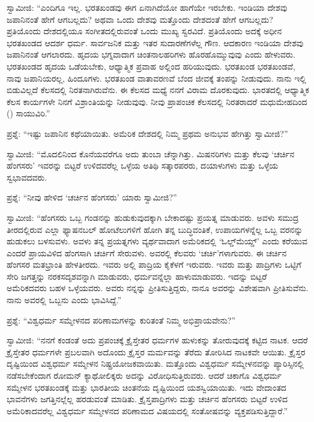 ಸ್ವಾಮೀಜಿ: “ಎಂದಿಗೂ ಇಲ್ಲ. ಭರತಖಂಡವು ಈಗ ಏನಾಗಿದೆಯೋ ಹಾಗೆಯೇ ಇರಬೇಕು. ಇಂಡಿಯಾ ದೇಶವು ಜಪಾನಿನಂತೆ ಹೇಗೆ ಆಗಬಲ್ಲದು? ಅಥವಾ ಒಂದು ದೇಶವು ಮತ್ತೊಂದು ದೇಶದಂತೆ ಹೇಗೆ ಆಗಬಲ್ಲದು? ಪ್ರತಿಯೊಂದು ದೇಶದಲ್ಲಿಯೂ ಸಂಗೀತದಲ್ಲಿರುವಂತೆ ಒಂದು ಮುಖ್ಯ ಸ್ವರವಿದೆ. ಪ್ರತಿಯೊಂದು ಅದಕ್ಕೆ ಅಧೀನ ಭರತಖಂಡದ ಆದರ್ಶ ಧರ್ಮ. ಸಾರ್ವಜನಿಕ ಮತ್ತು ಇತರ ಸುದಾರಣೆಗಳೆಲ್ಲ ಗೌಣ. ಆದಕಾರಣ ಇಂಡಿಯಾ ದೇಶವು ಜಪಾನಿನಂತೆ ಆಗಲಾರದು. ಹೃದಯ ಭಗ್ನವಾದಾಗ ಚಿಂತನಾಲಹರಿಗಳು ಹೊರಹೊಮ್ಮುವುವು ಎಂದು ಹೇಳುವರು. ಭರತಖಂಡದ ಹೃದಯ ಒಡೆಯಬೇಕು, ಆಧ್ಯಾತ್ಮಿಕ ಪ್ರವಾಹ ಅಲ್ಲಿಂದ ಹರಿಯುವುದು. ಭರತಖಂಡ ಭರತಖಂಡವೆ, ನಾವು ಜಪಾನಿಯರಲ್ಲ, ಹಿಂದೂಗಳು. ಭರತಖಂಡ ವಾತಾವರಣವೆ ಬೆಂದ ಜೀವಕ್ಕೆ ತಂಪನ್ನು ನೀಡುವುದು. ನಾನು ಇಲ್ಲಿ ಬಿಡುವಿಲ್ಲದೆ ಕೆಲಸದಲ್ಲಿ ನಿರತನಾಗಿರುವೆನು. ಈ ಕೆಲಸದ ಮಧ್ಯೆ ನನಗೆ ವಿರಾಮ ದೊರಕುವುದು. ಭಾರತದಲ್ಲಿ ಆಧ್ಯಾತ್ಮಿಕ ಕೆಲಸ ಕಾರ್ಯಗಳೇ ನಿನಗೆ ವಿಶ್ರಾಂತಿಯನ್ನು ನೀಡುವುವು. ನೀವು ಪ್ರಾಪಂಚಿಕ ಕೆಲಸದಲ್ಲಿ ನಿರತರಾದರೆ ಮಧುಮೇಹದಿಂದ () ಸಾಯುವಿರಿ.”

ಪ್ರಶ್ನೆ: “ಇಷ್ಟು ಜಪಾನಿನ ಕಥೆಯಾಯಿತು. ಅಮೆರಿಕ ದೇಶದಲ್ಲಿ ನಿಮ್ಮ ಪ್ರಥಮ ಅನುಭವ ಹೇಗಿತ್ತು ಸ್ವಾಮೀಜಿ?”

ಸ್ವಾಮೀಜಿ: “ಮೊದಲಿನಿಂದ ಕೊನೆಯವರೆಗೂ ಅದು ತುಂಬಾ ಚೆನ್ನಾಗಿತ್ತು. ಮಿಷನರಿಗಳು ಮತ್ತು ಕೆಲವು ‘ಚರ್ಚಿನ ಹೆಂಗಸರು’ ಇವರನ್ನು ಬಿಟ್ಟರೆ ಉಳಿದವರೆಲ್ಲ ಒಳ್ಳೆಯ ಅತಿಥಿ ಸತ್ಕಾರಪರರು, ದಯಾಳುಗಳು ಮತ್ತು ಒಳ್ಳೆಯ ಸ್ವಭಾವದವರು.

ಪ್ರಶ್ನೆ: “ನೀವು ಹೇಳಿದ ‘ಚರ್ಚಿನ ಹೆಂಗಸರು’ ಯಾರು ಸ್ವಾಮೀಜಿ?”

ಸ್ವಾಮೀಜಿ: “ಹೆಂಗಸರು ಒಬ್ಬ ಗಂಡನನ್ನು ಹುಡುಕುವುದಕ್ಕಾಗಿ ಬೇಕಾದಷ್ಟು ಪ್ರಯತ್ನ ಮಾಡುವರು. ಅವಳು ಸಮುದ್ರ ತೀರದಲ್ಲಿರುವ ಎಲ್ಲಾ ಫ್ಯಾಷನಬಲ್​ ಹೋಟೆಲುಗಳಿಗೆ ಹೋಗಿ ತನ್ನ ಬುದ್ಧಿವಂತಿಕೆ, ಉಪಾಯಗಳನ್ನೆಲ್ಲ ಒಬ್ಬ ವರನನ್ನು ಹುಡುಕಲು ಬಳಸುವಳು. ಅವಳು ತನ್ನ ಪ್ರಯತ್ನಗಳು ವ್ಯರ್ಥವಾದಾಗ ಅಮೆರಿಕದಲ್ಲಿ ‘ಓಲ್ಡ್​ ಮೆಯ್ಡ್​’ ಎಂದು ಕರೆಯುವ ಎಂದರೆ ಪ್ರಾಯವಿಳಿದ ಹೆಂಗಸಾಗಿ ಚರ್ಚಿಗೆ ಸೇರುವಳು. ಅವರಲ್ಲಿ ಕೆಲವರು ‘ಚರ್ಚಿ’ಗಳಾಗುವರು. ಈ ಚರ್ಚಿನ ಹೆಂಗಸರ ಮತಭ್ರಾಂತಿ ಹೇಳತೀರದು. ಇವರು ಅಲ್ಲಿ ಪಾದ್ರಿಯ ಕೈಕೆಳಗೆ ಇರುವರು. ಇವರು ಮತ್ತು ಪಾದ್ರಿಗಳು ಒಟ್ಟಿಗೆ ಸೇರಿ ಜಗತ್ತನ್ನು ನರಕಸದೃಶವನ್ನಾಗಿ ಮಾಡುವರು, ಧರ್ಮವನ್ನೆಲ್ಲಾ ಹಾಳುಮಾಡುವರು. ಇದನ್ನು ಬಿಟ್ಟರೆ ಅಮೆರಿಕದವರು ಬಹಳ ಒಳ್ಳೆಯವರು. ಅವರು ನನ್ನನ್ನು ಪ್ರೀತಿಸುತ್ತಿದ್ದರು, ನಾನೂ ಅವರನ್ನು ವಿಶೇಷವಾಗಿ ಪ್ರೀತಿಸುವೆನು. ನಾನು ಅವರಲ್ಲಿ ಒಬ್ಬನು ಎಂದು ಭಾವಿಸಿದ್ದೆ.”

ಪ್ರಶ್ನೆ: “ವಿಶ್ವಧರ್ಮ ಸಮ್ಮೇಳನದ ಪರಿಣಾಮಗಳನ್ನು ಕುರಿತಂತೆ ನಿಮ್ಮ ಅಭಿಪ್ರಾಯವೇನು?”

ಸ್ವಾಮೀಜಿ: “ನನಗೆ ಕಂಡಂತೆ ಅದು ಪ್ರಪಂಚಕ್ಕೆ ಕ್ರೈಸ್ತೇತರ ಧರ್ಮಗಳ ಹುಳುಕನ್ನು ತೋರುವುದಕ್ಕೆ ಕಟ್ಟಿದ ನಾಟಕ. ಆದರೆ ಕ್ರೈಸ್ತೇತರ ಧರ್ಮಗಳೇ ಪ್ರಬಲವಾಗಿ ಅದೊಂದು ಕ್ರೈಸ್ತರ ಮರ್ಮವನ್ನು ತೆರೆದು ತೋರಿಸಿದ ನಾಟಕವೇ ಆಯಿತು. ಕ್ರೈಸ್ತರ ದೃಷ್ಟಿಯಿಂದ ವಿಶ್ವಧರ್ಮ ಸಮ್ಮೇಳನ ನಿಷ್ಪ್ರಯೋಜಕವಾಯಿತು. ಮತ್ತೊಂದು ವಿಶ್ವಧರ್ಮ ಸಮ್ಮೇಳನವನ್ನು ಪ್ಯಾರಿಸ್ಸಿನಲ್ಲಿ ನಡೆಸಬೇಕೆಂದಾಗ ರೋಮನ್​ ಕ್ಯಾಥೋಲಿಕ್ಕರು ಅದನ್ನು ವಿರೋಧಿಸುತ್ತಿರುವರು. ಆದರೆ ಚಿಕಾಗೊ ವಿಶ್ವಧರ್ಮ ಸಮ್ಮೇಳನ ಭರತಖಂಡಕ್ಕೆ ಮತ್ತು ಭಾರತೀಯ ಚಿಂತನೆಯ ದೃಷ್ಟಿಯಿಂದ ಯಶಸ್ವಿಯಾಯಿತು. ಇದು ವೇದಾಂತದ ಭಾವನೆಗಳು ಜಗತ್ತಿನಲ್ಲೆಲ್ಲ ಹರಡುವಂತೆ ಮಾಡಿತು. ಕ್ರೈಸ್ತಪಾದ್ರಿಗಳು ಮತ್ತು ಚರ್ಚಿನ ಹೆಂಗಸರು ಬಿಟ್ಟರೆ ಉಳಿದ ಅಮೆರಿಕಾದವರೆಲ್ಲ ವಿಶ್ವಧರ್ಮ ಸಮ್ಮೇಳನದ ಪರಿಣಾಮದ ವಿಷಯದಲ್ಲಿ ಸಂತೋಷವನ್ನು ವ್ಯಕ್ತಪಡಿಸುತ್ತಿದ್ದಾರೆ.”

